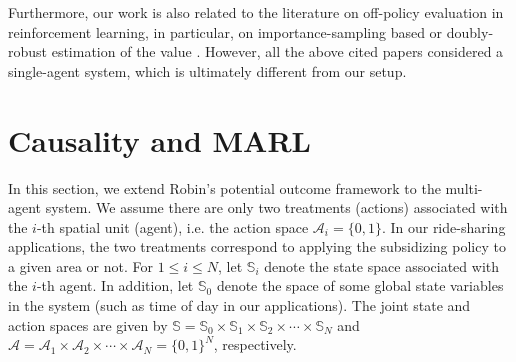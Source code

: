 \documentclass{article}
\begin{document}
Furthermore, our work is also related to the literature on off-policy evaluation in reinforcement learning, in particular, on importance-sampling based or doubly-robust estimation of the value \citep[see e.g.,][]{thomas2015,jiang2016,liu2018,kallus2019efficiently,uehara2019minimax,tang2019doubly}. However, all the above cited papers considered a single-agent system, which is ultimately different from our setup.\vspace{-0.1cm}

\section{Causality and MARL}\label{sec:causalMARL}\vspace{-0.2cm}
In this section, we extend Robin's potential outcome framework to the multi-agent system. We assume there are only two treatments (actions) associated with the $i$-th spatial unit (agent), i.e. the action space $\mathcal{A}_i=\{0,1\}$. In our ride-sharing applications, the two treatments correspond to applying the subsidizing policy to a given area or not. For $1\le i\le N$, let $\mathbb{S}_i$ denote the state space associated with the $i$-th agent. In addition, let $\mathbb{S}_0$ denote the space of some global state variables in the system (such as time of day in our applications). The joint state and action spaces are given by $\mathbb{S}=\mathbb{S}_0 \times \mathbb{S}_1 \times \mathbb{S}_2 \times \cdots \times \mathbb{S}_N$ and $\mathcal{A}=\mathcal{A}_1\times \mathcal{A}_2 \times  \cdots \times \mathcal{A}_N=\{0,1\}^N$, respectively. 
\end{document}

